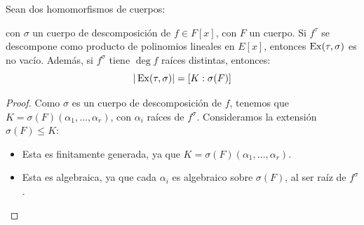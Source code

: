 \begin{prop}\label{prop:extension_3}%
    Sean dos homomorfismos de cuerpos:
    \begin{figure}[H]
        \centering
    \end{figure}
    \noindent
    con $\sigma$ un cuerpo de descomposición de $f\in F[x]$, con $F$ un cuerpo. Si $f^\tau$ se descompone como producto de polinomios lineales en $E[x]$, entonces $\operatorname{Ex}(\tau,\sigma)$ es no vacío. Además, si $f^\sigma$ tiene $\deg f$ raíces distintas, entonces:
    \begin{equation*}
        |\operatorname{Ex}(\tau, \sigma)| = [K:\sigma(F)]
    \end{equation*}
    \begin{proof}
        Como $\sigma$ es un cuerpo de descomposición de $f$, tenemos que $K = \sigma(F)(\alpha_1,\ldots,\alpha_r)$, con $\alpha_i$ raíces de $f^\sigma$. Consideramos la extensión $\sigma(F)\leq K$:
        \begin{itemize}
            \item Esta es finitamente generada, ya que $K = \sigma(F)(\alpha_1,\ldots,\alpha_r)$.
            \item Esta es algebraica, ya que cada $\alpha_i$ es algebraico sobre $\sigma(F)$, al ser raíz de $f^\sigma$.
        \end{itemize}


\end{proof}
\end{prop}
